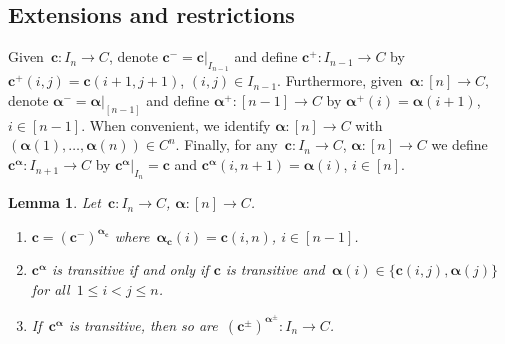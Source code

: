 \documentclass[12pt, reqno]{amsart}
\newtheorem{lemma}[theorem]{Lemma}
\theoremstyle{definition}
\numberwithin{equation}{section}
\newenvironment{enumalph}{\begin{enumerate}[label={\rm(\alph*)},leftmargin=*]}{\end{enumerate}}
\begin{document}
\subsection{Extensions and restrictions}
Given~$\mathbf c:I_n\to C$, denote $\mathbf c^-=\mathbf c|_{I_{n-1}}$ and define $\mathbf c^+:I_{n-1}\to C$ by $\mathbf c^+(i,j)=\mathbf c(i+1,j+1)$, $(i,j)\in I_{n-1}$.
Furthermore, given~$\boldsymbol\alpha:[n]\to C$, denote $\boldsymbol{\alpha}^-
=\boldsymbol{\alpha}|_{[n-1]}$ and define $\boldsymbol\alpha^+:[n-1]\to C$ by
$\boldsymbol{\alpha}^+(i)=\boldsymbol{\alpha}(i+1)$, $i\in [n-1]$. When convenient, 
we identify $\boldsymbol{\alpha}:[n]\to C$ with $(\boldsymbol{\alpha}(1),\dots,
\boldsymbol{\alpha}(n))\in C^n$. 
Finally, for any~$\mathbf c:I_n\to C$, $\boldsymbol{\alpha}:[n]\to C$ we
define~$\mathbf c^{\boldsymbol{\alpha}}:I_{n+1}\to C$ by $\mathbf c^{\boldsymbol{\alpha}}|_{I_n}=
\mathbf c$ and $\mathbf c^{\boldsymbol\alpha}(i,n+1)=\boldsymbol{\alpha}(i)$, $i\in[n]$.
\begin{lemma}\label{lem:rest ext trans}
Let~$\mathbf c:I_n\to C$, $\boldsymbol{\alpha}:[n]\to C$.
\begin{enumalph} 
\item \label{lem:rest ext trans.c}
$\mathbf c=(\mathbf c^-)^{\boldsymbol\alpha_{\mathbf c}}$ where~$\boldsymbol\alpha_{\mathbf c}(i)=\mathbf c(i,n)$,
$i\in [n-1]$. 
\item \label{lem:rest ext trans.a}
$\mathbf c^{\boldsymbol{\alpha}}$ is transitive if and only if
$\mathbf c$ is transitive and~$\boldsymbol\alpha(i)\in\{\mathbf c(i,j),
\boldsymbol\alpha(j)\}$ for all~$1\le i<j\le n$. 
\item \label{lem:rest ext trans.b}
If~$\mathbf c^{\boldsymbol\alpha}$ is transitive, then so are~$(\mathbf c^\pm)^{\boldsymbol\alpha^\pm}:I_n\to C$.
\end{enumalph}
\end{lemma}
\end{document}
